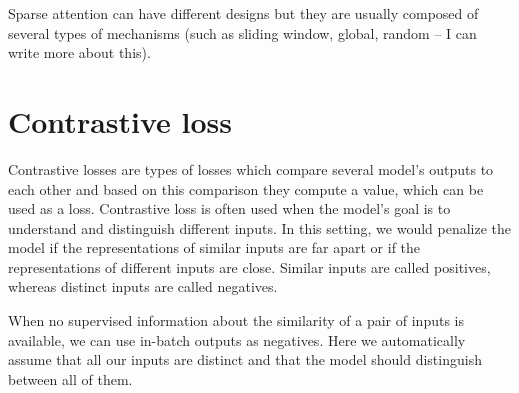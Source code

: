 Sparse attention can have different designs but they are usually composed of
several types of mechanisms (such as sliding window, global, random -- I can
write more about this).

\section{Contrastive loss}

Contrastive losses are types of losses which compare several model's outputs to
each other and based on this comparison they compute a value, which can be used
as a loss. Contrastive loss is often used when the model's goal is to
understand and distinguish different inputs. In this setting, we would penalize
the model if the representations of similar inputs are far apart or if the
representations of different inputs are close. Similar inputs are called
positives, whereas distinct inputs are called negatives.

When no supervised information about the similarity of a pair of inputs is
available, we can use in-batch outputs as negatives. Here we automatically
assume that all our inputs are distinct and that the model should distinguish
between all of them.
